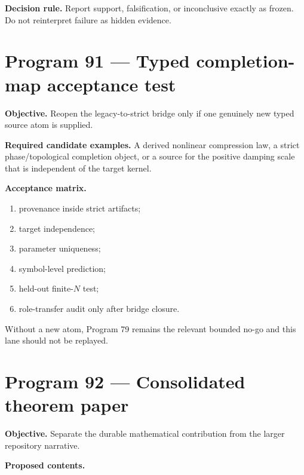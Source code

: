 \documentclass[11pt,a4paper,openany]{report}
\begin{document}
\textbf{Decision rule.} Report support, falsification, or inconclusive exactly as frozen. Do not reinterpret failure as hidden evidence.

\section{Program 91 --- Typed completion-map acceptance test}

\textbf{Objective.} Reopen the legacy-to-strict bridge only if one genuinely new typed source atom is supplied.

\textbf{Required candidate examples.} A derived nonlinear compression law, a strict phase/\allowbreak{}topological completion object, or a source for the positive damping scale that is independent of the target kernel.

\textbf{Acceptance matrix.}

\begin{enumerate}
\item 
provenance inside strict artifacts;

\item 
target independence;

\item 
parameter uniqueness;

\item 
symbol-level prediction;

\item 
held-out finite-\(N\) test;

\item 
role-transfer audit only after bridge closure.

\end{enumerate}

Without a new atom, Program 79 remains the relevant bounded no-go and this lane should not be replayed.

\section{Program 92 --- Consolidated theorem paper}

\textbf{Objective.} Separate the durable mathematical contribution from the larger repository narrative.

\textbf{Proposed contents.}
\end{document}
